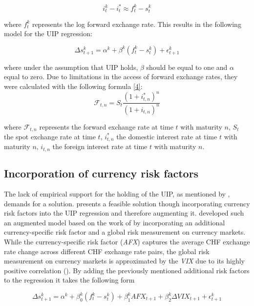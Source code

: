 \documentclass[a4paper,11pt,oneside]{article}
\begin{document}
\begin{equation}\label{2}
i_{t}^k-i_{t}^* \approx f_{t}^k-s_{t}^k
\end{equation}

where $f_{t}^k$ represents the log forward exchange rate. This results in the following model for the UIP regression:

\begin{equation}\label{3}
\Delta s_{t+1}^k=\alpha^k+\beta^k(f_{t}^k-s_{t}^k)+\epsilon_{t+1}^k
\end{equation}

where under the assumption that UIP holds, $\beta$ should be equal to one and $\alpha$ equal to zero. Due to limitations in the access of forward exchange rates, they were calculated with the following formula \ref{4}: 
\begin{equation}\label{4}
\mathcal{F}_{t,n}=S_{t}\frac{(1+i_{t,n}^*)^n}{(1+i_{t,n})^n}
\end{equation}

where $\mathcal{F}_{t,n}$ represents the forward exchange rate at time $t$ with maturity $n$, $S_{t}$ the spot exchange rate at time $t$, $i_{t,n}^*$ the domestic interest rate at time $t$ with maturity $n$, $i_{t,n}$ the foreign interest rate at time $t$ with maturity $n$. 

\subsection{Incorporation of currency risk factors}
The lack of empirical support for the holding of the UIP, as mentioned by \cite{Grisse and Nitschka 2015}, demands for a solution. \cite{Verdelhan 2010} presents a feasible solution though incorporating currency risk factors into the UIP regression and therefore augmenting it. \cite{Grisse and Nitschka 2015} developed such an augmented model based on the work of \cite{Lustig and Roussanov and Verdelhan 2011} by incorporating an additional currency-specific risk factor and a global risk measurement on currency markets. While the currency-specific risk factor (\emph{AFX}) captures the average CHF exchange rate change across different CHF exchange rate pairs, the global risk measurement on currency markets is approximated by the \emph{VIX} due to its highly positive correlation (\cite{Grisse and Nitschka 2015}). By adding the previously mentioned additional risk factors to the regression it takes the following form

\begin{equation}\label{5}
\Delta s_{t+1}^k=\alpha^k+\beta_{0}^k(f_{t}^k-s_{t}^k)+\beta_{1}^k AFX_{t+1}+\beta_{2}^k\Delta VIX_{t+1}+\epsilon_{t+1}^k
\end{equation}
\end{document}
